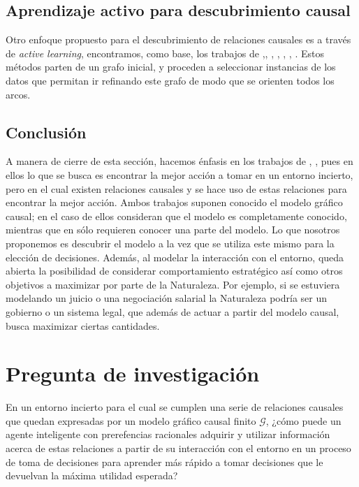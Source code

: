 \documentclass[11pt]{article}
\theoremstyle{plain}
\begin{document}
\subsection{Aprendizaje activo para descubrimiento causal}
Otro enfoque propuesto para el descubrimiento de relaciones causales es a través de \textit{active learning}, encontramos, como base, los trabajos de \cite{tong2001active},\cite{murphy2001active}, \cite{meganck2006learning}, \cite{he2008active}, \cite{hauser2012two}, \cite{10.1007/978-3-319-56970-3_9}, \cite{rubenstein2017probabilistic}. Estos métodos parten de un grafo inicial, y proceden a seleccionar instancias de los datos que permitan ir refinando este grafo de modo que se orienten todos los arcos.\\
\subsection{Conclusión}
A manera de cierre de esta sección, hacemos énfasis en los trabajos de \cite{lattimoreNIPS2016}, \cite{sen2017identifying}, pues en ellos lo que se busca es encontrar la mejor acción a tomar en un entorno incierto, pero en el cual existen relaciones causales y se hace uso de estas relaciones para encontrar la mejor acción. Ambos trabajos suponen conocido el modelo gráfico causal; en el caso de \cite{lattimoreNIPS2016} ellos consideran que el modelo es completamente conocido, mientras que en \cite{sen2017identifying} sólo requieren conocer una parte del modelo. Lo que nosotros proponemos es descubrir el modelo a la vez que se utiliza este mismo para la elección de decisiones. Además, al modelar la interacción con el entorno, queda abierta la posibilidad de considerar comportamiento estratégico así como otros objetivos a maximizar por parte de la Naturaleza. Por ejemplo, si se estuviera modelando un juicio o  una negociación salarial la Naturaleza podría ser un gobierno o un sistema legal, que además de actuar a partir del modelo causal, busca maximizar ciertas cantidades.

\section{Pregunta de investigación}
En un entorno incierto para el cual se cumplen una serie de relaciones causales que quedan expresadas por un modelo gráfico causal finito $\mathcal{G}$, ¿cómo puede un agente inteligente con prerefencias racionales adquirir y utilizar información acerca de estas relaciones a partir de su interacción con el entorno en un proceso de toma de decisiones para aprender más rápido a tomar decisiones que le devuelvan la máxima utilidad esperada?
\end{document}
